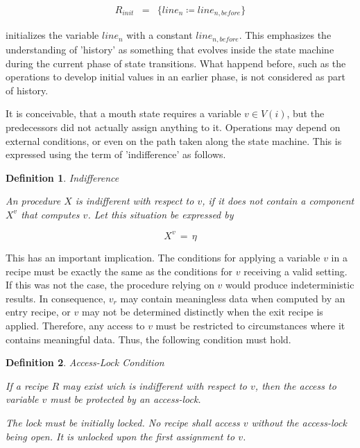 \documentclass[12pt,a4paper]{scrartcl}
\newtheorem{definition}{Definition}
\begin{document}
\begin{eqnarray}
    R_{init} & = & \{ line_n \coloneqq line_{n,before} \}
\end{eqnarray}

initializes the variable $line_n$ with a constant $line_{n,before}$. This
emphasizes the understanding of 'history' as something that evolves inside the
state machine during the current phase of state transitions. What happend
before, such as the operations to develop initial values in an earlier phase,
is not considered as part of history. 

It is conceivable, that a mouth state requires a variable $v \in V(i)$, but the
predecessors did not actually assign anything to it.  Operations may depend on
external conditions, or even on the path taken along the state machine. This is
expressed using the term of 'indifference' as follows.

\begin{definition} Indifference

    An procedure $X$ is indifferent with respect to $v$, if it does not contain
    a component $X^v$ that computes $v$.  Let this situation be expressed by
    
    \begin{equation} 
        X^v \,=\,\eta 
    \end{equation} 

\end{definition}

This has an important implication.  The conditions for applying a variable $v$
in a recipe must be exactly the same as the conditions for $v$ receiving a
valid setting.  If this was not the case, the procedure relying on $v$ would
produce indeterministic results.  In consequence, $v_r$ may contain meaningless
data when computed by an entry recipe, or $v$ may not be determined distinctly
when the exit recipe is applied.  Therefore, any access to $v$ must be
restricted to circumstances where it contains meaningful data.  Thus, the
following condition must hold.

\begin{definition} Access-Lock Condition \label{cond:access-lock}

   If a recipe $R$ may exist wich is indifferent with respect to $v$, then
   the access to variable $v$ must be protected by an access-lock. 

   The lock must be initially locked.  No recipe shall access $v$ without the
   access-lock being open. It is unlocked upon the first assignment to $v$.
    
\end{definition}
\end{document}
